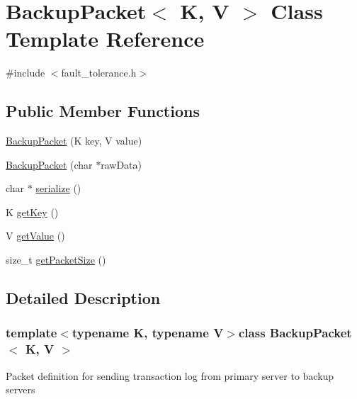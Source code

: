 \hypertarget{classBackupPacket}{\section{Backup\-Packet$<$ K, V $>$ Class Template Reference}
\label{classBackupPacket}
}


{\ttfamily \#include $<$fault\-\_\-tolerance.\-h$>$}

\subsection*{Public Member Functions}
\begin{DoxyCompactItemize}
\item 
\hyperlink{classBackupPacket_a26f60ca0db42e0bc9e7c0aa3df6e561f}{Backup\-Packet} (K key, V value)
\item 
\hyperlink{classBackupPacket_a09ccdce78d18e44e22dc3371035bed20}{Backup\-Packet} (char $\ast$raw\-Data)
\item 
char $\ast$ \hyperlink{classBackupPacket_a626af7de776bd98ea1a322a4e9fd87bd}{serialize} ()
\item 
K \hyperlink{classBackupPacket_a36d0369d548f537a12840627a9fabbfd}{get\-Key} ()
\item 
V \hyperlink{classBackupPacket_a35e76302bebf4a0e6c871426844553fc}{get\-Value} ()
\item 
size\-\_\-t \hyperlink{classBackupPacket_a3bdc1916566a9cffbdd26abe5c87bdad}{get\-Packet\-Size} ()
\end{DoxyCompactItemize}


\subsection{Detailed Description}
\subsubsection*{template$<$typename K, typename V$>$class Backup\-Packet$<$ K, V $>$}

Packet definition for sending transaction log from primary server to backup servers 


